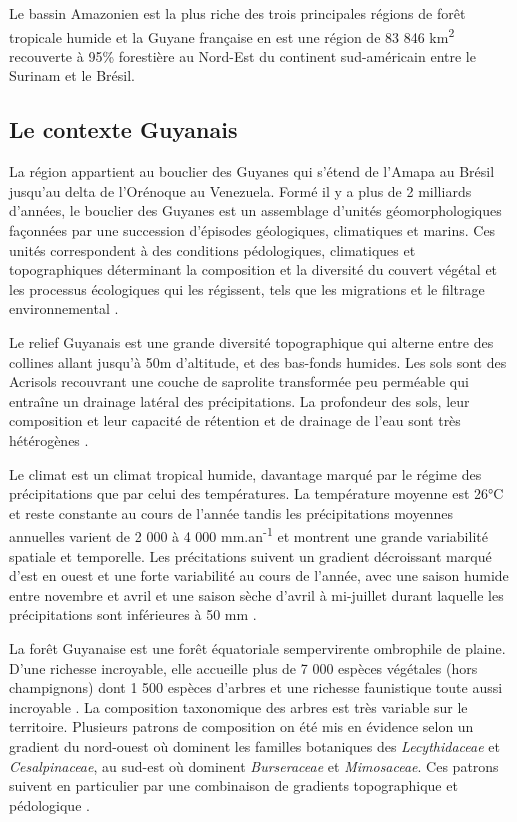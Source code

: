 \documentclass[
  11pt,
  french,
  A4paper,
  extrafontsizes,onecolumn,openright
  ]{memoir}
\begin{document}
Le bassin Amazonien est la plus riche des trois principales régions de
forêt tropicale humide \autocite{Gentry1988} et la Guyane française en
est une région de 83 846 km\textsuperscript{2} recouverte à 95\%
forestière au Nord-Est du continent sud-américain entre le Surinam et le
Brésil.

\subsection{Le contexte Guyanais}\label{le-contexte-guyanais}

La région appartient au bouclier des Guyanes qui s'étend de l'Amapa au
Brésil jusqu'au delta de l'Orénoque au Venezuela. Formé il y a plus de 2
milliards d'années, le bouclier des Guyanes est un assemblage d'unités
géomorphologiques façonnées par une succession d'épisodes géologiques,
climatiques et marins. Ces unités correspondent à des conditions
pédologiques, climatiques et topographiques déterminant la composition
et la diversité du couvert végétal et les processus écologiques qui les
régissent, tels que les migrations et le filtrage environnemental
\autocite{Guitet2015}.

Le relief Guyanais est une grande diversité topographique qui alterne
entre des collines allant jusqu'à 50m d'altitude, et des bas-fonds
humides. Les sols sont des Acrisols recouvrant une couche de saprolite
transformée peu perméable qui entraîne un drainage latéral des
précipitations. La profondeur des sols, leur composition et leur
capacité de rétention et de drainage de l'eau sont très hétérogènes
\autocites{Ferry2010}{Robert2003}.

Le climat est un climat tropical humide, davantage marqué par le régime
des précipitations que par celui des températures. La température
moyenne est 26°C et reste constante au cours de l'année tandis les
précipitations moyennes annuelles varient de 2 000 à 4 000
mm.an\textsuperscript{-1} et montrent une grande variabilité spatiale et
temporelle. Les précitations suivent un gradient décroissant marqué
d'est en ouest et une forte variabilité au cours de l'année, avec une
saison humide entre novembre et avril et une saison sèche d'avril à
mi-juillet durant laquelle les précipitations sont inférieures à 50 mm
\autocite{Wagner2011}.

La forêt Guyanaise est une forêt équatoriale sempervirente ombrophile de
plaine. D'une richesse incroyable, elle accueille plus de 7 000 espèces
végétales (hors champignons) dont 1 500 espèces d'arbres et une richesse
faunistique toute aussi incroyable \autocite{DeNoter2008}. La
composition taxonomique des arbres est très variable sur le territoire.
Plusieurs patrons de composition on été mis en évidence selon un
gradient du nord-ouest où dominent les familles botaniques des
\emph{Lecythidaceae} et \emph{Cesalpinaceae}, au sud-est où dominent
\emph{Burseraceae} et \emph{Mimosaceae}. Ces patrons suivent en
particulier par une combinaison de gradients topographique et
pédologique \autocites{Sabatier1989}[ cf
Toto]{Sabatier1997}{Guitet2015}.
\end{document}

